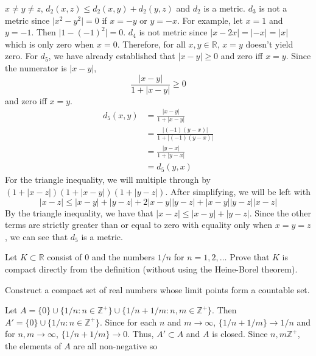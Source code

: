 \begin{exercise}
  \(x\neq y\neq z\), \(d_2(x,z)\leq d_2(x,y) + d_2(y,z)\) and \(d_2\) is a
  metric.
  \(d_3\) is not a metric since \(\lvert x^2 - y^2\rvert = 0\) if \(x = -y\) or
  \(y = -x\).
  For example, let \(x = 1\) and \(y = -1\).
  Then \(\lvert 1 - (-1)^2\rvert = 0\).
  \(d_4\) is not metric since \(\lvert x - 2x\rvert = \lvert -x\rvert =
  \lvert x\rvert\) which is only zero when \(x = 0\).
  Therefore, for all \(x,y\in\mathbb{R}\), \(x = y\) doesn't yield zero.
  For \(d_5\), we have already established that \(\lvert x - y\rvert\geq 0\)
  and zero iff \(x = y\).
  Since the numerator is \(\lvert x - y\lvert\),
  \[
  \frac{\lvert x - y\rvert}{1 + \lvert x - y\rvert}\geq 0
  \]
  and zero iff \(x = y\).
  \begin{align*}
    d_5(x, y) & = \frac{\lvert x - y\rvert}{1 + \lvert x - y\rvert}\\
              & = \frac{\lvert (-1)(y - x)\rvert}
                {1 + \lvert (-1)(y - x)\rvert}\\
              & = \frac{\lvert y - x\rvert}{1 + \lvert y - x\rvert}\\
              & = d_5(y, x)
  \end{align*}
  For the triangle inequality, we will multiple through by
  \((1 + \lvert x - z\rvert)(1 + \lvert x - y\rvert)(1 + \lvert y - z\rvert)\).
  After simplifying, we will be left with
  \[
  \lvert x - z\rvert\leq\lvert x - y\rvert + \lvert y - z\rvert +
  2\lvert x - y\rvert\lvert y - z\rvert + \lvert x - y\rvert\lvert y - z\rvert
  \lvert x - z\rvert
  \]
  By the triangle inequality, we have that
  \(\lvert x - z\rvert\leq\lvert x - y\rvert + \lvert y - z\rvert\).
  Since the other terms are strictly greater than or equal to zero with
  equality only when \(x = y = z\), we can see that \(d_5\) is a metric.
\item
  Let \(K\subset\mathbb{R}\) consist of \(0\) and the numbers \(1/n\) for
  \(n = 1,2,\ldots\)
  Prove that \(K\) is compact directly from the definition (without using the
  Heine-Borel theorem).
\item
  Construct a compact set of real numbers whose limit points form a countable
  set.
  \par\smallskip
  Let \(A = \{0\}\cup\{1/n\colon n\in\mathbb{Z}^+\}\cup
  \{1/n + 1/m\colon n,m\in\mathbb{Z}^+\}\).
  Then \(A' = \{0\}\cup\{1/n\colon n\in\mathbb{Z}^+\}\).
  Since for each \(n\) and \(m\to\infty\), \(\{1/n + 1/m\}\to 1/n\) and
  for \(n,m\to\infty\), \(\{1/n + 1/m\}\to 0\).
  Thus, \(A'\subset A\) and \(A\) is closed.
  Since \(n,m\mathbb{Z}^+\), the elements of \(A\) are all non-negative so

\end{exercise}
